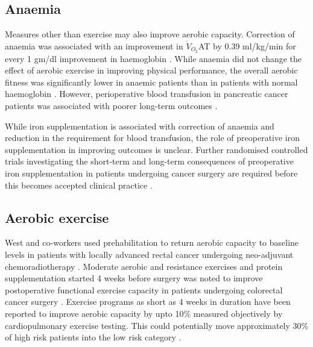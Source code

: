 \subsection{Anaemia}

Measures other than exercise may also improve aerobic capacity. 
Correction of anaemia was associated with an improvement in $\dot{V}_{O_2}$AT by 0.39 ml/kg/min for every 1 gm/dl improvement in haemoglobin \parencite{wright_cardiopulmonary_2014}. 
While anaemia did not change the effect of aerobic exercise in improving physical performance, the overall aerobic fitness was significantly lower in anaemic patients than in patients with normal haemoglobin \parencite{bellotto_anemia_2011}.
However, perioperative blood transfusion in pancreatic cancer patients was associated with poorer long-term outcomes \parencite{kneuertz_effects_2011, sutton_perioperative_2014}.

While iron supplementation is associated with correction of anaemia and reduction in the requirement for blood transfusion, the role of preoperative iron supplementation in improving outcomes is unclear. 
Further randomised controlled trials investigating the short-term and long-term consequences of preoperative iron supplementation in patients undergoing cancer surgery are required before this becomes accepted clinical practice \parencite{beris_perioperative_2008,hallet_impact_2014}.

\subsection{Aerobic exercise}

West and co-workers used prehabilitation to return aerobic capacity to baseline levels in patients with locally advanced rectal cancer undergoing neo-adjuvant chemoradiotherapy \parencite{west_effect_2015}.
Moderate aerobic and resistance exercises and protein supplementation started 4 weeks before surgery was noted to improve postoperative functional exercise capacity in patients undergoing colorectal cancer surgery \parencite{gillis_prehabilitation_2014}.
Exercise programs as short as 4 weeks in duration have been reported to improve aerobic capacity by upto 10\%  measured objectively by cardiopulmonary exercise testing.
This could potentially move approximately 30\% of high risk patients into the low risk category \parencite{dunne_pmo-029_2012}.

